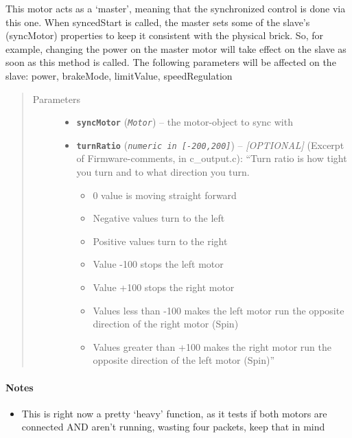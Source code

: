 \documentclass[letterpaper,10pt,english]{sphinxmanual}
\begin{document}
\begin{fulllineitems}
\begin{fulllineitems}
This motor acts as a `master', meaning that the synchronized control is done via
this one. When syncedStart is called, the master sets some of the slave's
(syncMotor) properties to keep it consistent with the physical brick. So, for
example, changing the power on the master motor will take effect
on the slave as soon as this method is called.
The following parameters will be affected on the slave: power, brakeMode,
limitValue, speedRegulation
\begin{quote}\begin{description}
\item[{Parameters}] \leavevmode\begin{itemize}
\item {} 
\textbf{\texttt{syncMotor}} (\emph{\texttt{Motor}}) -- the motor-object to sync with

\item {} 
\textbf{\texttt{turnRatio}} (\emph{\texttt{numeric in {[}-200,200{]}}}) -- 
\emph{{[}OPTIONAL{]}}  (Excerpt of Firmware-comments, in c\_output.c):
``Turn ratio is how tight you turn and to what direction you turn.
\begin{itemize}
\item {} 
0 value is moving straight forward

\item {} 
Negative values turn to the left

\item {} 
Positive values turn to the right

\item {} 
Value -100 stops the left motor

\item {} 
Value +100 stops the right motor

\item {} 
Values less than -100 makes the left motor run the opposite direction of the right motor (Spin)

\item {} 
Values greater than +100 makes the right motor run the opposite direction of the left motor (Spin)''

\end{itemize}


\end{itemize}

\end{description}\end{quote}
\paragraph{Notes}
\begin{itemize}
\item {} 
This is right now a pretty `heavy' function, as it tests if both motors are
connected AND aren't running, wasting four packets, keep that in mind


\end{itemize}
\end{fulllineitems}
\end{fulllineitems}
\end{document}
